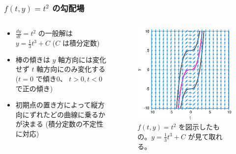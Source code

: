 \documentclass[dvipdfmx,aspectratio=169,20pt]{beamer}
\newcommand{\myfontsetting}[3]{{\fontsize{#1}{#2}\selectfont #3}}
\begin{document}
\begin{frame}
\frametitle{\myfontsetting{28pt}{28pt}{[図解] $f(t,y) = t^2$ の勾配場}}
\begin{columns}[t]
\begin{column}{0.48\textwidth} 
\vspace{-8mm}
\begin{itemize}
    \item 
    \myfontsetting{12pt}{12pt}{
    $\frac{dy}{dt} = t^2$ の一般解は $y=\frac{1}{3}t^3+C$ \myfontsetting{10pt}{10pt}{($C$ は積分定数)}
    }
    \vspace{-1mm}
    \item 
    \myfontsetting{12pt}{12pt}{
    棒の傾きは $y$ 軸方向には変化せず $t$ 軸方向にのみ変化する
    }\\
    \vspace{-2mm}
    \myfontsetting{6pt}{6pt}{
    ($t=0$ で傾き0、 $t>0, t<0$ で正の傾き)
    }
    \vspace{-1mm}
    \item \myfontsetting{12pt}{12pt}{
        初期点の置き方によって縦方向にずれたどの曲線に乗るかが決まる
        \myfontsetting{10pt}{10pt}{(積分定数の不定性に対応)}
        }
\end{itemize}
\end{column}

\begin{column}{0.52\textwidth} 
\begin{figure}[h]
	\begin{center}
\vspace{-10mm}
    	\includegraphics[width=1.0\textwidth]{fig12-4_differential_equation_tp3.eps}
	\end{center}
	\vspace{-5mm}
	\caption{\myfontsetting{10pt}{10pt}{$f(t,y)=t^2$ を図示したもの。$y=\frac{1}{3}t^3+C$ が見て取れる。}}
\end{figure}
\end{column}
\end{columns}
\end{frame}
\end{document}

